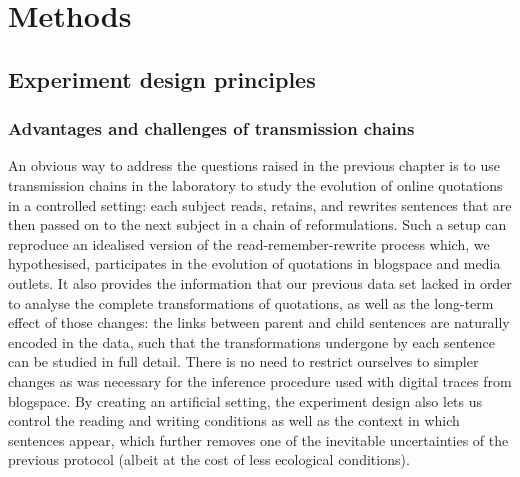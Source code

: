 \section{Methods}\label{sec:gistr-methods}

\subsection{Experiment design
principles}\label{experiment-design-principles}

\subsubsection{Advantages and challenges of transmission
chains}\label{advantages-and-challenges-of-transmission-chains}

An obvious way to address the questions raised in the previous chapter
is to use transmission chains in the laboratory to study the evolution
of online quotations in a controlled setting: each subject reads,
retains, and rewrites sentences that are then passed on to the next
subject in a chain of reformulations. Such a setup can reproduce an
idealised version of the read-remember-rewrite process which, we
hypothesised, participates in the evolution of quotations in blogspace
and media outlets. It also provides the information that our previous
data set lacked in order to analyse the complete transformations of
quotations, as well as the long-term effect of those changes: the links
between parent and child sentences are naturally encoded in the data,
such that the transformations undergone by each sentence can be studied
in full detail. There is no need to restrict ourselves to simpler
changes as was necessary for the inference procedure used with digital
traces from blogspace. By creating an artificial setting, the experiment
design also lets us control the reading and writing conditions as well
as the context in which sentences appear, which further removes one of
the inevitable uncertainties of the previous protocol (albeit at the
cost of less ecological conditions).

